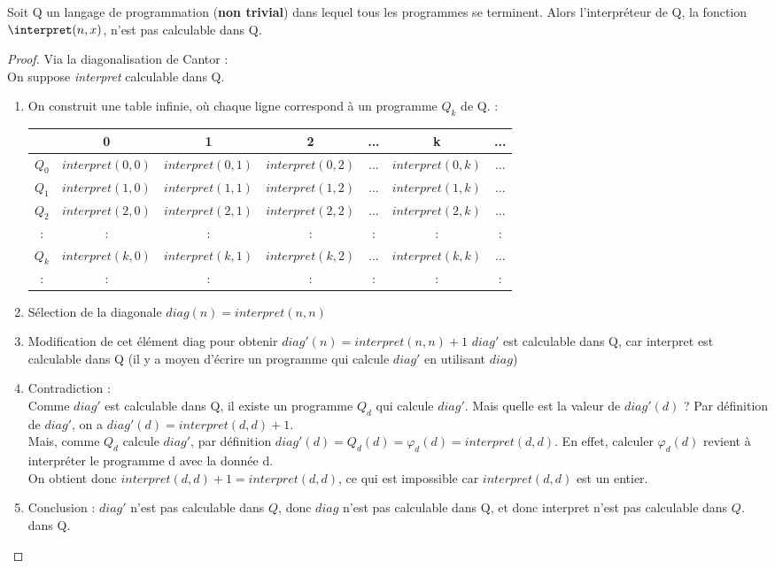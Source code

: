 \begin{mytheo}
	\label{Hoare_Allison}
Soit Q un langage de programmation (\textbf{non trivial}) dans lequel tous les programmes se terminent.	Alors l'interpréteur de Q, la fonction $\interpret(n,x)$, n'est pas calculable dans Q.
\end{mytheo}

\begin{proof} Via la diagonalisation de Cantor : \\
On suppose \textit{interpret} calculable dans Q.
\begin{enumerate}
	\item On construit une table infinie, où chaque ligne correspond à un programme $Q_k$ de Q.   : \\
		\begin{tabular}{|c||c|c|c|c|c|c|}
			\hline
			& 0 & 1 & 2 & ... & k & ... \\
			\hline
			$Q_0$ & $interpret(0,0)$ & $interpret(0,1)$ & $interpret(0,2)$ & ... & $interpret(0,k)$ & ... \\
			$Q_1$ & $interpret(1,0)$ & $interpret(1,1)$ & $interpret(1,2)$ & ... & $interpret(1,k)$ & ... \\
			$Q_2$ & $interpret(2,0)$ & $interpret(2,1)$ & $interpret(2,2)$ & ... & $interpret(2,k)$ & ... \\
			: & : &:& : & : & : &:\\
			$Q_k$ & $interpret(k,0)$ & $interpret(k,1)$ & $interpret(k,2)$ & ... & $interpret(k,k)$ & ... \\
			: & : &:& : & : & : &:\\
			\hline
		\end{tabular}
	\item Sélection de la diagonale
		$diag(n) = interpret(n,n)$
	\item Modification de cet élément diag pour obtenir
		$diag'(n) = interpret(n,n)+1$
		$diag'$ est calculable dans Q, car interpret est calculable dans Q (il y a moyen
		d'écrire un programme qui calcule $diag'$ en utilisant $diag$)

	\item Contradiction :\\
	       	Comme $diag'$ est calculable dans Q, il existe un programme $Q_d$ qui calcule $diag'$.
		Mais quelle est la valeur de $diag'(d)$ ?
		Par définition de $diag'$, on a $diag'(d) = interpret(d,d)+1$. \\
		Mais, comme $Q_d$ calcule $diag'$, par définition $diag'(d) = Q_d(d) = \varphi_d(d) = interpret(d,d)$.
		En effet, calculer $\varphi_d(d)$ revient à interpréter le programme
		d avec la donnée d. \\
		On obtient donc $interpret(d,d)+1 = interpret(d,d)$, ce qui est impossible car $interpret(d,d)$ est un entier.
	\item Conclusion : $diag'$ n'est pas calculable dans $Q$, donc $diag$
	n'est pas calculable dans Q, et donc interpret n'est pas calculable dans $Q$.
dans Q.
\end{enumerate}
\end{proof}

